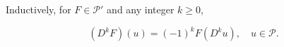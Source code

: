 Inductively, for $F \in \mathcal{P}'$ and any integer $k \geq 0$,

$$(D^k F)(u) = (-1)^k F(D^k u), \quad u \in \mathcal{P}.$$
